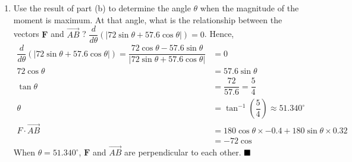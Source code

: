 \begin{enumerate}
\begin{enumerate}[label={(\alph{*})}]
              \item Use the result of part (b) to determine the angle $\theta$ when the magnitude
                    of the moment is maximum. At that angle, what is the relationship between the
                    vectors $\mathbf{F}$ and $\overrightarrow{A B}$ ?
                    $\dfrac{d}{d\theta}(|72\sin\theta + 57.6\cos\theta|) = 0$. Hence,
                    \begin{align*}
                        \dfrac{d}{d\theta}(|72\sin\theta + 57.6\cos\theta|) = \dfrac{72\cos\theta - 57.6\sin\theta}{|72\sin\theta + 57.6\cos\theta|} & = 0                                                         \\
                        72\cos\theta                                                                                                                 & = 57.6\sin\theta                                            \\
                        \tan\theta                                                                                                                   & = \dfrac{72}{57.6} = \dfrac{5}{4}                           \\
                        \theta                                                                                                                       & = \tan^{-1}\left(\dfrac{5}{4}\right) \approx 51.340^{\circ} \\
                        F \cdot \overrightarrow{A B}                                                                                                 & = 180\cos\theta \times -0.4 + 180\sin\theta \times 0.32     \\
                                                                                                                                                     & = -72\cos
                    \end{align*}
                    When $\theta = 51.340^{\circ}$, $\mathbf{F}$ and $\overrightarrow{A B}$ are perpendicular to each other. $\hfill\blacksquare$
          \end{enumerate}
\end{enumerate}